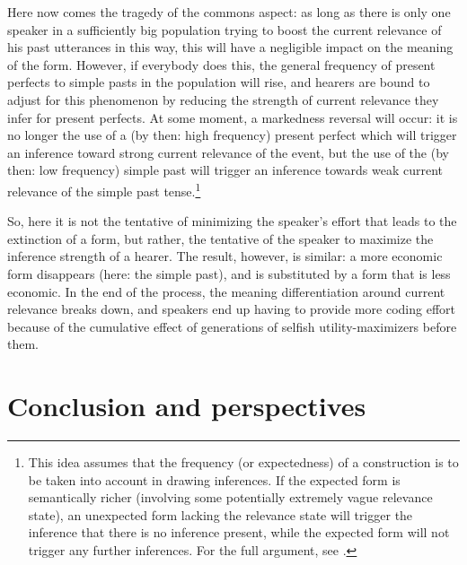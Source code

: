 \documentclass[output=paper,hidelinks]{langscibook}
\begin{document}
Here now comes the tragedy of the commons aspect: as long as there is only one speaker in a sufficiently big population trying to boost the current relevance of his past utterances in this way, this will have a negligible impact on the meaning of the form. However, if everybody does this, the general frequency of present perfects to simple pasts in the population will rise, and hearers are bound to adjust for this phenomenon by reducing the strength of current relevance they infer for present perfects. At some moment, a markedness reversal will occur: it is no longer the use of a (by then: high frequency) present perfect which will trigger an inference toward strong current relevance of the event, but the use of the (by then: low frequency) simple past will trigger an inference towards weak current relevance of the simple past tense.\footnote{This idea assumes that the frequency (or expectedness) of a construction is to be taken into account in drawing inferences. If the expected form is semantically richer (involving some potentially extremely vague relevance state), an unexpected form lacking the relevance state will trigger the inference that there is no inference present, while the expected form will not trigger any further inferences. For the full argument, see \citet{schaden09}.}\largerpage

So, here it is not the tentative of minimizing the speaker's effort that leads to the extinction of a form, but rather, the tentative of the speaker to maximize the inference strength of a hearer. The result, however, is similar: a more economic form disappears (here: the simple past), and is substituted by a form that is less economic. In the end of the process, the meaning differentiation around current relevance breaks down, and speakers end up having to provide more coding effort because of the cumulative effect of generations of selfish utility-maximizers before them.



\section{Conclusion and perspectives}
\label{sec:concl-persp}
\end{document}
